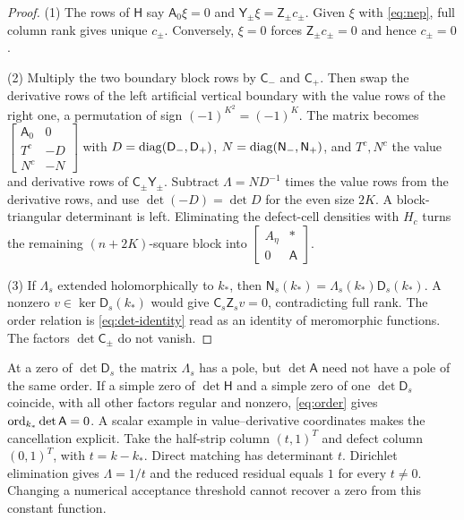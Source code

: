 \begin{proof}
(1) The rows of $\mathsf H$ say $\mathsf A_0\xi=0$ and $\mathsf Y_\pm\xi=\mathsf Z_\pm c_\pm$.
Given $\xi$ with \eqref{eq:nep}, full column rank gives unique $c_\pm$.
Conversely, $\xi=0$ forces $\mathsf Z_\pm c_\pm=0$ and hence $c_\pm=0$.

(2) Multiply the two boundary block rows by $\mathsf C_-$ and $\mathsf C_+$. Then swap the
derivative rows of the left artificial vertical boundary with the value rows of the
right one, a
permutation of sign $(-1)^{K^2}=(-1)^K$. The matrix becomes
$\left[\begin{smallmatrix}\mathsf A_0&0\\ T^c&-D\\ N^c&-N\end{smallmatrix}\right]$ with
$D=\operatorname{diag}(\mathsf D_-,\mathsf D_+)$, $N=\operatorname{diag}(\mathsf N_-,\mathsf N_+)$, and $T^c,N^c$ the
value and derivative rows of $\mathsf C_\pm\mathsf Y_\pm$. Subtract $\Lambda=ND^{-1}$
times the value rows from the derivative rows, and use $\det(-D)=\det D$ for
the even size $2K$. A block-triangular determinant is left. Eliminating the
defect-cell densities with $H_c$ turns the remaining $(n+2K)$-square block into
$\left[\begin{smallmatrix}A_\eta&*\\0&\mathsf A\end{smallmatrix}\right]$.

(3) If $\Lambda_s$ extended holomorphically to $k_*$, then
$\mathsf N_s(k_*)=\Lambda_s(k_*)\mathsf D_s(k_*)$. A nonzero
$v\in\ker\mathsf D_s(k_*)$ would give $\mathsf C_s\mathsf Z_sv=0$, contradicting full rank.
The order relation is \eqref{eq:det-identity} read as an identity of
meromorphic functions. The factors $\det\mathsf C_\pm$ do not vanish.
\end{proof}

At a zero of $\det\mathsf D_s$ the matrix $\Lambda_s$ has a pole, but
$\det\mathsf A$ need not have a pole of the same order. If a simple zero
of $\det\mathsf H$ and a simple zero of one $\det\mathsf D_s$ coincide,
with all other factors regular and nonzero, \eqref{eq:order} gives
$\operatorname{ord}_{k_*}\det\mathsf A=0$. A scalar example in value--derivative
coordinates makes the cancellation explicit. Take the half-strip column
$(t,1)^T$ and defect column $(0,1)^T$, with $t=k-k_*$. Direct matching
has determinant $t$. Dirichlet elimination gives $\Lambda=1/t$ and the
reduced residual equals $1$ for every $t\ne0$.
Changing a numerical acceptance threshold cannot recover a zero from this
constant function.

